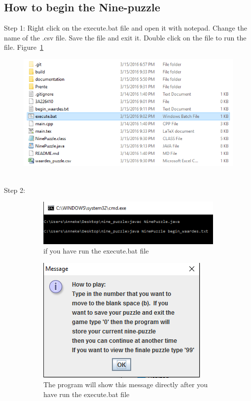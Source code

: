 \documentclass[10pt]{article}
\begin{document}
\subsection*{How to begin the Nine-puzzle}
Step 1:
Right click on the execute.bat file and open it with notepad.
Change the name of the .csv file.  Save the file and exit it.  Double click on the file to run the file. Figure~\ref{beginfile}
\begin{figure}
\centering
 \includegraphics[scale=0.5]{./Prente/beginfile.png}
 \caption{}
 \label{beginfile}
\end{figure}
\\Step 2:
\begin{figure}[b!]
    \centering
    \begin{subfigure}[b]{0.5\textwidth}
        \centering
        \includegraphics[scale=0.8]{./Prente/begincmd.png}
        \caption{if you have run the execute.bat file}
        \label{begincmd}
    \end{subfigure}%
 
    \begin{subfigure}[b]{0.5\textwidth}
        \centering
        \includegraphics[scale=0.8]{./Prente/MessageBegin.png}
        \caption{The program will show this message directly after you have run the execute.bat file}
        \label{MessageBegin}
    \end{subfigure}
    \caption{\label{1}}
   \end{figure}
\end{document}
